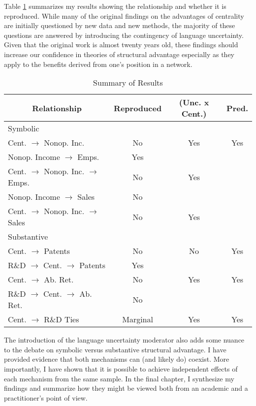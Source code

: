 Table \ref{summary} summarizes my results showing the relationship and whether it is reproduced. While many of the original findings on the advantages of centrality are initially questioned by new data and new methods, the majority of these questions are answered by introducing the contingency of language uncertainty. Given that the original work is almost twenty years old, these findings should increase our confidence in theories of structural advantage especially as they apply to the benefits derived from one's position in a network.

\begin{table}[htbp]\centering \caption{Summary of Results\label{summary}}
\begin{tabular}{l  c  c  c  }\hline\hline
\multicolumn{1}{c}{Relationship} & Reproduced & (Unc. x Cent.) & Pred. \\ \hline
Symbolic \\ \hline
Cent. $\rightarrow$ Nonop. Inc. & No & Yes & Yes\\
Nonop. Income $\rightarrow$ Emps. & Yes\\
Cent. $\rightarrow$ Nonop. Inc. $\rightarrow$ Emps. & No & Yes\\
Nonop. Income $\rightarrow$ Sales & No\\
Cent. $\rightarrow$ Nonop. Inc. $\rightarrow$ Sales & No & Yes\\
\hline
Substantive \\ \hline
Cent. $\rightarrow$ Patents & No & No & Yes\\
R\&D $\rightarrow$ Cent. $\rightarrow$ Patents & Yes\\
Cent. $\rightarrow$ Ab. Ret. & No & Yes & Yes\\
R\&D $\rightarrow$ Cent. $\rightarrow$ Ab. Ret. & No\\
Cent. $\rightarrow$ R\&D Ties & Marginal & Yes & Yes\\
\hline \hline 
 \end{tabular}
\end{table}

The introduction of the language uncertainty moderator also adds some nuance to the debate on symbolic versus substantive structural advantage. I have provided evidence that both mechanisms can (and likely do) coexist. More importantly, I have shown that it is possible to achieve independent effects of each mechanism from the same sample. In the final chapter, I synthesize my findings and summarize how they might be viewed both from an academic and a practitioner's point of view.

